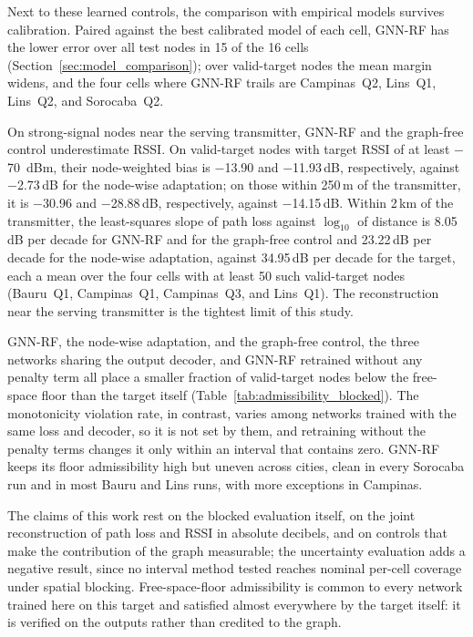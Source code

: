\documentclass{ieeeaccess}
\begin{document}
Next to these learned controls, the comparison with empirical models survives calibration. Paired against the best calibrated model of each cell, GNN-RF has the lower error over all test nodes in 15 of the 16 cells (Section~\ref{sec:model_comparison}); over valid-target nodes the mean margin widens, and the four cells where GNN-RF trails are Campinas~Q2, Lins~Q1, Lins~Q2, and Sorocaba~Q2.

On strong-signal nodes near the serving transmitter, GNN-RF and the graph-free control underestimate RSSI. On valid-target nodes with target RSSI of at least $-$70~dBm, their node-weighted bias is $-$13.90 and $-$11.93\,dB, respectively, against $-$2.73\,dB for the node-wise adaptation; on those within 250\,m of the transmitter, it is $-$30.96 and $-$28.88\,dB, respectively, against $-$14.15\,dB. Within 2\,km of the transmitter, the least-squares slope of path loss against $\log_{10}$ of distance is 8.05\,dB per decade for GNN-RF and for the graph-free control and 23.22\,dB per decade for the node-wise adaptation, against 34.95\,dB per decade for the target, each a mean over the four cells with at least 50 such valid-target nodes (Bauru~Q1, Campinas~Q1, Campinas~Q3, and Lins~Q1). The reconstruction near the serving transmitter is the tightest limit of this study.

GNN-RF, the node-wise adaptation, and the graph-free control, the three networks sharing the output decoder, and GNN-RF retrained without any penalty term all place a smaller fraction of valid-target nodes below the free-space floor than the target itself (Table~\ref{tab:admissibility_blocked}). The monotonicity violation rate, in contrast, varies among networks trained with the same loss and decoder, so it is not set by them, and retraining without the penalty terms changes it only within an interval that contains zero. GNN-RF keeps its floor admissibility high but uneven across cities, clean in every Sorocaba run and in most Bauru and Lins runs, with more exceptions in Campinas.

The claims of this work rest on the blocked evaluation itself, on the joint reconstruction of path loss and RSSI in absolute decibels, and on controls that make the contribution of the graph measurable; the uncertainty evaluation adds a negative result, since no interval method tested reaches nominal per-cell coverage under spatial blocking. Free-space-floor admissibility is common to every network trained here on this target and satisfied almost everywhere by the target itself: it is verified on the outputs rather than credited to the graph.
\end{document}
